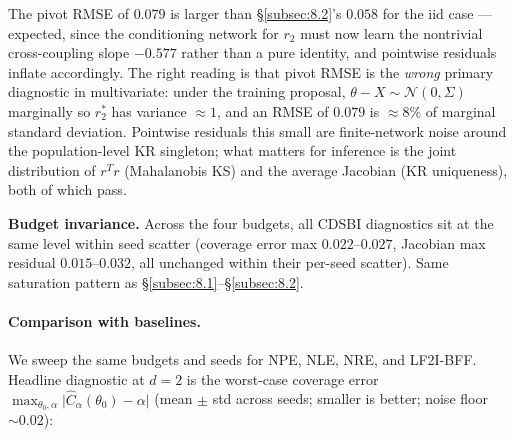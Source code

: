 \documentclass[11pt]{article}
\begin{document}
The pivot RMSE of \(0.079\) is larger than \S\ref{subsec:8.2}'s
\(0.058\) for the iid case --- expected, since the conditioning
network for \(r_2\) must now learn the nontrivial cross-coupling
slope \(-0.577\) rather than a pure identity, and pointwise residuals
inflate accordingly. The right reading is that pivot RMSE is the
\emph{wrong} primary diagnostic in multivariate: under the training
proposal, \(\theta - X \sim \mathcal{N}(0, \Sigma)\) marginally so
\(r_2^*\) has variance \(\approx 1\), and an RMSE of \(0.079\) is
\(\approx 8\%\) of marginal standard deviation. Pointwise residuals
this small are finite-network noise around the population-level
KR singleton; what matters for inference is the joint distribution
of \(r^T r\) (Mahalanobis KS) and the average Jacobian
(KR uniqueness), both of which pass.

\textbf{Budget invariance.} Across the four budgets, all CDSBI
diagnostics sit at the same level within seed scatter (coverage
error max \(0.022\)--\(0.027\), Jacobian max residual
\(0.015\)--\(0.032\), all unchanged within their per-seed scatter).
Same saturation pattern as \S\ref{subsec:8.1}--\S\ref{subsec:8.2}.

\paragraph{Comparison with baselines.} We sweep the same budgets and
seeds for NPE, NLE, NRE, and LF2I-BFF. Headline diagnostic at \(d = 2\)
is the worst-case coverage error
\(\max_{\theta_0, \alpha}\bigl|\hat{C}_\alpha(\theta_0) - \alpha\bigr|\)
(mean \(\pm\) std across seeds; smaller is better; noise floor
\(\sim 0.02\)):
\end{document}
